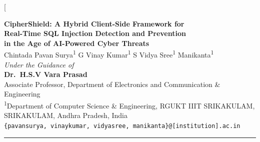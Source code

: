 \documentclass[10pt,twocolumn]{article}
\begin{document}
\twocolumn[{%
\begin{center}
  {\Large\bfseries
   CipherShield: A Hybrid Client-Side Framework for\\[4pt]
   Real-Time SQL Injection Detection and Prevention\\[2pt]
   in the Age of AI-Powered Cyber Threats}\\[10pt]

  {\normalsize
    Chintada Pavan Surya\textsuperscript{1}\quad
    G Vinay Kumar\textsuperscript{1}\quad
    S Vidya Sree\textsuperscript{1}\quad
    Manikanta\textsuperscript{1}
  }\\[4pt]
  {\small\textit{Under the Guidance of}}\\[2pt]
  {\normalsize\bfseries Dr.\ H.S.V Vara Prasad}\\[1pt]
  {\small Associate Professor, Department of Electronics and Communication \& Engineering}\\[2pt]
  {\small\textsuperscript{1}Department of Computer Science \& Engineering,
   RGUKT IIIT SRIKAKULAM, SRIKAKULAM, Andhra Pradesh, India}\\[3pt]
  {\small\texttt{\{pavansurya, vinaykumar, vidyasree, manikanta\}@[institution].ac.in}}\\[8pt]
  \rule{\textwidth}{0.8pt}
\end{center}

}
\end{document}
